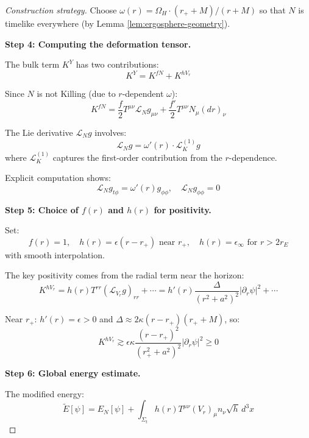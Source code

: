 \documentclass[12pt,a4paper]{article}
\begin{document}
\begin{proof}[Construction strategy]
Choose $\omega(r) = \Omega_H \cdot (r_+ + M)/(r + M)$ so that $N$ is timelike everywhere (by Lemma \ref{lem:ergosphere-geometry}).

\textbf{Step 4: Computing the deformation tensor.}

The bulk term $K^Y$ has two contributions:
\begin{equation}
K^Y = K^{fN} + K^{hV_r}
\end{equation}

Since $N$ is not Killing (due to $r$-dependent $\omega$):
\begin{equation}
K^{fN} = \frac{f}{2}T^{\mu\nu}\mathcal{L}_N g_{\mu\nu} + \frac{f'}{2}T^{\mu\nu}N_\mu(dr)_\nu
\end{equation}

The Lie derivative $\mathcal{L}_N g$ involves:
\begin{equation}
\mathcal{L}_N g = \omega'(r) \cdot \mathcal{L}_{K}^{(1)} g
\end{equation}
where $\mathcal{L}_{K}^{(1)}$ captures the first-order contribution from the $r$-dependence.

Explicit computation shows:
\begin{equation}
\mathcal{L}_N g_{t\phi} = \omega'(r) g_{\phi\phi}, \quad \mathcal{L}_N g_{\phi\phi} = 0
\end{equation}

\textbf{Step 5: Choice of $f(r)$ and $h(r)$ for positivity.}

Set:
\begin{equation}
f(r) = 1, \quad h(r) = \epsilon(r - r_+) \text{ near } r_+, \quad h(r) = \epsilon_\infty \text{ for } r > 2r_E
\end{equation}
with smooth interpolation.

The key positivity comes from the radial term near the horizon:
\begin{equation}
K^{hV_r} = h(r) T^{rr}(\mathcal{L}_{V_r}g)_{rr} + \cdots = h'(r)\frac{\Delta}{(r^2+a^2)^2}|\partial_r\psi|^2 + \cdots
\end{equation}

Near $r_+$: $h'(r) = \epsilon > 0$ and $\Delta \approx 2\kappa(r - r_+)(r_+ + M)$, so:
\begin{equation}
K^{hV_r} \gtrsim \epsilon\kappa \frac{(r-r_+)^2}{(r_+^2+a^2)^2}|\partial_r\psi|^2 \geq 0
\end{equation}

\textbf{Step 6: Global energy estimate.}

The modified energy:
\begin{equation}
\tilde{E}[\psi] = E_N[\psi] + \int_{\Sigma_t} h(r)T^{\mu\nu}(V_r)_\mu n_\nu \sqrt{h}\, d^3x
\end{equation}


\end{proof}
\end{document}

